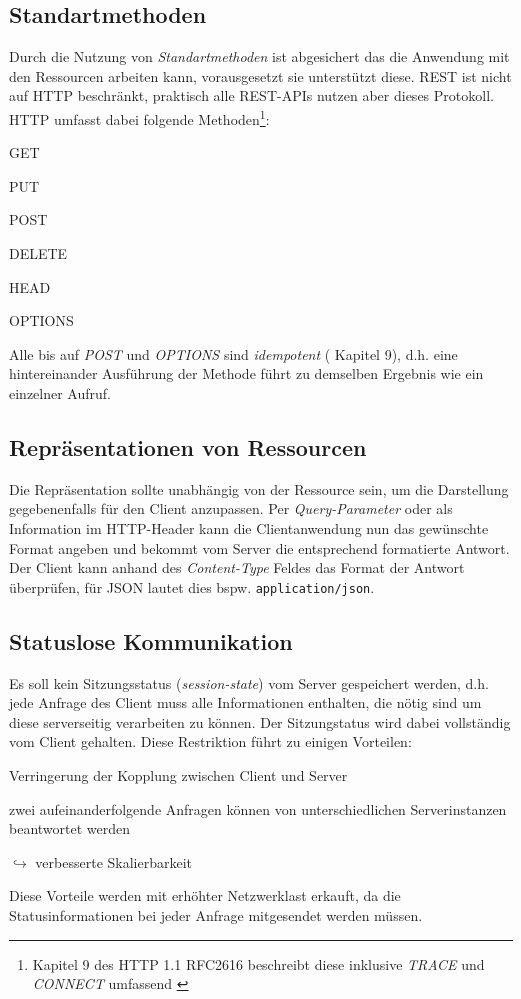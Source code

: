 \subsection{Standartmethoden}

Durch die Nutzung von \emph{Standartmethoden} ist abgesichert das die Anwendung mit den Ressourcen arbeiten kann, vorausgesetzt sie unterstützt diese. \gls{REST} ist nicht auf HTTP beschränkt, praktisch alle REST-APIs nutzen aber dieses Protokoll. HTTP umfasst dabei folgende Methoden\footnote{Kapitel 9 des HTTP 1.1 RFC2616 beschreibt diese inklusive \emph{TRACE} und \emph{CONNECT} umfassend \cite{HTTP11RFC}}:
\begin{compactitem}
    \item GET
    \item PUT
    \item POST
    \item DELETE
    \item HEAD
    \item OPTIONS
\end{compactitem}

Alle bis auf \emph{POST} und \emph{OPTIONS} sind \emph{idempotent} (\cite{HTTP11RFC} Kapitel 9), d.h. eine hintereinander Ausführung der Methode führt zu demselben Ergebnis wie ein einzelner Aufruf.

\subsection{Repräsentationen von Ressourcen}

Die Repräsentation sollte unabhängig von der Ressource sein, um die Darstellung gegebenenfalls für den Client anzupassen. Per \emph{Query-Parameter} oder als Information im HTTP-Header kann die Clientanwendung nun das gewünschte Format angeben und bekommt vom Server die entsprechend formatierte Antwort. Der Client kann anhand des \emph{Content-Type} Feldes das Format der Antwort überprüfen, für \gls{JSON} lautet dies bspw. \texttt{application/json}.

\subsection{Statuslose Kommunikation}

Es soll kein Sitzungsstatus (\emph{session-state}) vom Server gespeichert werden, d.h. jede Anfrage des Client muss alle Informationen enthalten, die nötig sind um diese serverseitig verarbeiten zu können. Der Sitzungstatus wird dabei vollständig vom Client gehalten. Diese Restriktion führt zu einigen Vorteilen:
\begin{compactitem}
	\item Verringerung der Kopplung zwischen Client und Server
	\item zwei aufeinanderfolgende Anfragen können von unterschiedlichen Serverinstanzen beantwortet werden
	\item[$\hookrightarrow$] verbesserte Skalierbarkeit
\end{compactitem}
Diese Vorteile werden mit erhöhter Netzwerklast erkauft, da die Statusinformationen bei jeder Anfrage mitgesendet werden müssen.